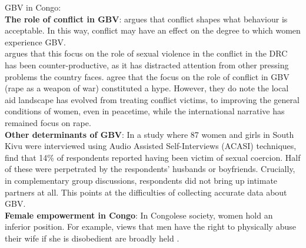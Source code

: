 \documentclass[11pt,a4paper]{scrartcl} %
\begin{document}
GBV in Congo: \\
\textbf{The role of conflict in GBV}: \cite{Porter2019} argues that conflict shapes what behaviour is acceptable. In this way, conflict may have an effect on the degree to which women experience GBV. \\%

\cite{Autesserre2012a} argues that this focus on the role of sexual violence in the conflict in the DRC has been counter-productive, as it has distracted attention from other pressing problems the country faces.	\cite{Hilhorst2018} agree that the focus on the role of conflict in GBV (rape as a weapon of war) constituted a hype. However, they do note the local aid landscape has evolved from treating conflict victims, to improving the general conditions of women, even in peacetime, while the international narrative has remained focus on rape. \\
\textbf{Other determinants of GBV}: In a study where 87 women and girls in South Kivu were interviewed using Audio Assisted Self-Interviews (ACASI) techniques, \citet{Stark2017} find that 14\% of respondents reported having been victim of sexual coercion. Half of these were perpetrated by the respondents' husbands or boyfriends. Crucially, in complementary group discussions, respondents did not bring up intimate partners at all. This points at the difficulties of collecting accurate data about GBV. \\
	
\textbf{Female empowerment in Congo}: In Congolese society, women hold an inferior position. For example, views that men have the right to physically abuse their wife if she is disobedient are broadly held \citep{Quattrochi2019}. \\
\end{document}
